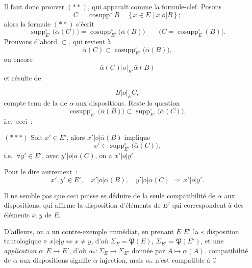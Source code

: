 \documentclass[11pt,a4paper]{article}
\begin{document}
 Il faut donc prouver $(**)$, qui apparaît comme la formule-clef. Posons
\[ C = \operatorname{cosupp}^{\circ} B = \{\, x \in E \mid x \mathrel{|o|} B \,\}~; \]
alors la formule $(**)$ s'écrit
\[ \operatorname{supp}^{\circ}_{E'}\bigl(\bar\alpha(C)\bigr) = \operatorname{cosupp}^{\circ}_{E'}\bigl(\bar\alpha(B)\bigr) \qquad \bigl(C = \operatorname{cosupp}^{\circ}_{E}(B)\bigr). \]
Prouvons d'abord $\subset$, qui revient à
\[ \bar\alpha(C) \subset \operatorname{cosupp}^{\circ}_{E'}\bigl(\bar\alpha(B)\bigr), \]
ou encore
\[ \bar\alpha(C) \mathrel{|o|_{E'}} \bar\alpha(B) \]
 et résulte de

\[ B \mathrel{|o|_{E}} C, \]
compte tenu de la   de $\alpha$ aux dispositions. Reste la question
\[ \operatorname{cosupp}^{\circ}_{E'}\bigl(\bar\alpha(B)\bigr) \subset \operatorname{supp}^{\circ}_{E'}\bigl(\bar\alpha(C)\bigr), \]
i.e.\ ceci~:

$(***)$ Soit $x' \in E'$, alors $x' \mathrel{|o|} \bar\alpha(B)$ implique
\[ x' \in \operatorname{supp}^{\circ}_{E'}\bigl(\bar\alpha(C)\bigr), \]
i.e.\ $\forall y' \in E'$, avec $y' \mathrel{|o|} \bar\alpha(C)$, on a $x' \mathrel{|o|} y'$.

Pour le dire autrement~:
\[ x', y' \in E', \quad x' \mathrel{|o|} \bar\alpha(B), \quad y' \mathrel{|o|} \bar\alpha(C) \ \Longrightarrow\ x' \mathrel{|o|} y'. \]

Il ne semble pas que ceci puisse se déduire de la seule compatibilité de $\alpha$ aux dispositions, qui affirme   la disposition d'éléments  de $E'$ qui \struck{\ill{}} correspondent à des éléments  $x, y$ de $E$. 

 D'ailleurs, on a un contre-exemple immédiat, en prenant  $E$  $E'$ la « disposition tautologique » $x \mathrel{|o|} y \Longleftrightarrow x \neq y$, d'où $\Sigma_E = \mathfrak{P}(E)$, $\Sigma_{E'} = \mathfrak{P}(E')$, et une \emph{application} $\alpha : E \to E'$, d'où $\alpha_{*} : \Sigma_E \to \Sigma_{E'}$ donnée par $A \mapsto \alpha(A)$.   compatibilité de $\alpha$ aux dispositions signifie  $\alpha$ injection, mais $\alpha_{*}$ n'est \struck{\ill{}} compatible à $\complement$
\end{document}
